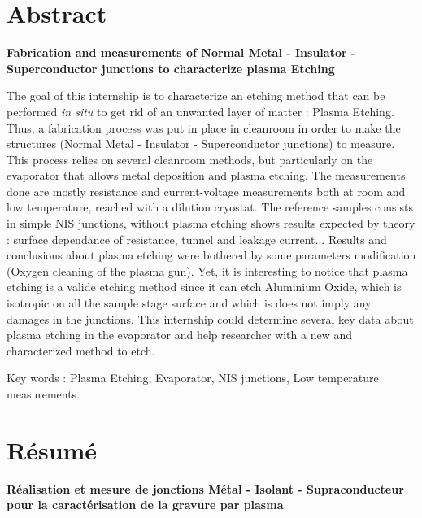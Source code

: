 \pagestyle{empty}
\newpage
\section*{Abstract}

\begin{Large}
\textbf{Fabrication and measurements of Normal Metal - Insulator - Superconductor junctions to characterize plasma Etching}
\end{Large}

\vspace{0.3cm}

The goal of this internship is to characterize an etching method that can be performed \textit{in situ} to get rid of an unwanted layer of matter : Plasma Etching. Thus, a fabrication process was put in place in cleanroom in order to make the structures (Normal Metal - Insulator - Superconductor junctions) to measure. This process relies on several cleanroom methods, but particularly on the evaporator that allows metal deposition and plasma etching. The measurements done are mostly resistance and current-voltage measurements both at room and low temperature, reached with a dilution cryostat. The reference samples consists in simple NIS junctions, without plasma etching shows results expected by theory : surface dependance of resistance, tunnel and leakage current... Results and conclusions about plasma etching were bothered by some parameters modification (Oxygen cleaning of the plasma gun). Yet, it is interesting to notice that plasma etching is a valide etching method since it can etch Aluminium Oxide, which is isotropic on all the sample stage surface and which is does not imply any damages in the junctions. This internship could determine several key data about plasma etching in the evaporator and help researcher with a new and characterized method to etch.

Key words : Plasma Etching, Evaporator, NIS junctions, Low temperature measurements.

\section*{Résumé}

\begin{Large}
    \textbf{Réalisation et mesure de jonctions Métal - Isolant - Supraconducteur pour la caractérisation de la gravure par plasma}
\end{Large}

\vspace{0.3cm}

